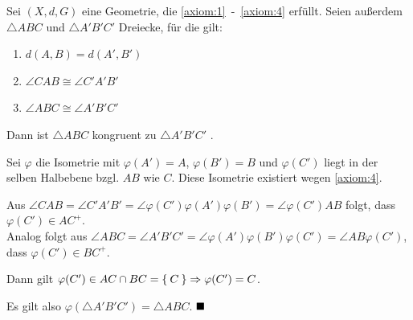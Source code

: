 \begin{bemerkung}%
    Sei $(X, d, G)$ eine Geometrie, die \ref{axiom:1}~-~\ref{axiom:4} erfüllt.
    Seien außerdem $\triangle ABC$ und $\triangle A'B'C'$ Dreiecke, für die gilt:
    \begin{enumerate}[label=(\roman*)]
        \item \label{bem:wsw.i} $d(A, B) = d(A', B')$
        \item \label{bem:wsw.ii} $\angle CAB \cong \angle C'A'B'$
        \item \label{bem:wsw.iii} $\angle ABC \cong \angle A'B'C'$
    \end{enumerate}

    Dann ist $\triangle ABC$ kongruent zu $\triangle A'B'C'$ .
\end{bemerkung}

\begin{beweis}
    Sei $\varphi$ die Isometrie mit $\varphi(A') = A$, $\varphi(B') = B$
    und $\varphi(C')$ liegt in der selben Halbebene bzgl. $AB$ wie $C$.
    Diese Isometrie existiert wegen \ref{axiom:4}.

    Aus $\angle CAB = \angle C'A'B' = \angle \varphi(C')\varphi(A')\varphi(B') = \angle \varphi(C')AB$ folgt, dass $\varphi(C')\in AC^+$.\\
    Analog folgt aus $\angle ABC = \angle A'B'C' = \angle \varphi(A')\varphi(B')\varphi(C') = \angle AB\varphi(C')$, dass $\varphi(C') \in BC^+$.

    Dann gilt $\varphi(C') \in AC \cap BC = \Set{C} \Rightarrow \varphi(C')=C$.

    Es gilt also $\varphi(\triangle A'B'C') = \triangle ABC$. $\qed$
\end{beweis}


